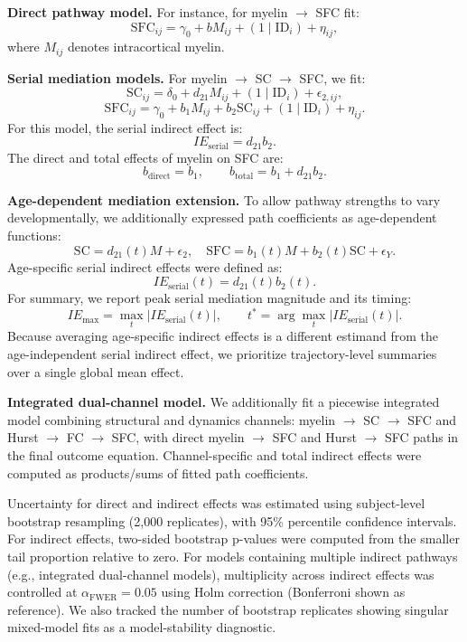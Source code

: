 \textbf{Direct pathway model.}  
For instance, for myelin $\rightarrow$ SFC fit:
\[
\mathrm{SFC}_{ij} = \gamma_0 + bM_{ij} + (1 \mid \mathrm{ID}_i) + \eta_{ij},
\]
where $M_{ij}$ denotes intracortical myelin.

\textbf{Serial mediation models.}  
For myelin $\rightarrow$ SC $\rightarrow$ SFC, we fit:
\[
\mathrm{SC}_{ij} = \delta_0 + d_{21}M_{ij} + (1 \mid \mathrm{ID}_i) + \epsilon_{2,ij},
\]
\[
\mathrm{SFC}_{ij} = \gamma_0 + b_1M_{ij} + b_2\mathrm{SC}_{ij} + (1 \mid \mathrm{ID}_i) + \eta_{ij}.
\]
For this model, the serial indirect effect is:
\[
IE_{\mathrm{serial}} = d_{21}b_2.
\]
The direct and total effects of myelin on SFC are:
\[
b_{\mathrm{direct}} = b_1,\qquad
b_{\mathrm{total}} = b_1 + d_{21}b_2.
\]

\textbf{Age-dependent mediation extension.}
To allow pathway strengths to vary developmentally, we additionally expressed path
coefficients as age-dependent functions:
\[
\mathrm{SC} = d_{21}(t)M + \epsilon_2,\quad
\mathrm{SFC} = b_1(t)M + b_2(t)\mathrm{SC} + \epsilon_Y.
\]
Age-specific serial indirect effects were defined as:
\[
IE_{\mathrm{serial}}(t)=d_{21}(t)b_2(t).
\]
For summary, we report peak serial mediation magnitude and its timing:
\[
IE_{\max}=\max_t |IE_{\mathrm{serial}}(t)|,\qquad
t^*=\arg\max_t |IE_{\mathrm{serial}}(t)|.
\]
Because averaging age-specific indirect effects is a different estimand from the
age-independent serial indirect effect, we prioritize trajectory-level summaries over a
single global mean effect.

\textbf{Integrated dual-channel model.}  
We additionally fit a piecewise integrated model combining structural and dynamics channels:
myelin $\rightarrow$ SC $\rightarrow$ SFC and Hurst $\rightarrow$ FC $\rightarrow$ SFC, with direct myelin $\rightarrow$ SFC and Hurst $\rightarrow$ SFC paths in the final outcome equation. Channel-specific and total indirect effects were computed as products/sums of fitted path coefficients.

Uncertainty for direct and indirect effects was estimated using subject-level bootstrap resampling (2,000 replicates), with 95\% percentile confidence intervals. For indirect effects, two-sided bootstrap p-values were computed from the smaller tail proportion relative to zero. For models containing multiple indirect pathways (e.g., integrated dual-channel models), multiplicity across indirect effects was controlled at $\alpha_{\mathrm{FWER}}=0.05$ using Holm correction (Bonferroni shown as reference). We also tracked the number of bootstrap replicates showing singular mixed-model fits as a model-stability diagnostic.

